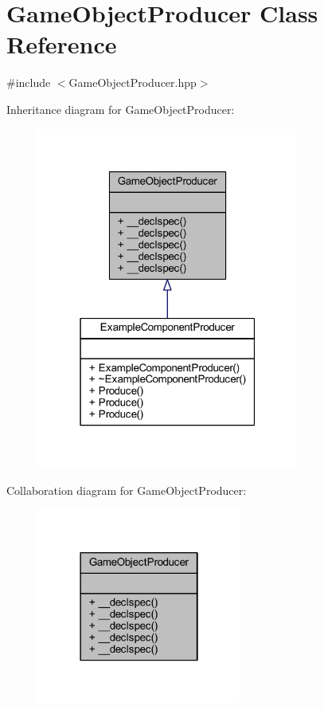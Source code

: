 \hypertarget{class_game_object_producer}{\section{Game\-Object\-Producer Class Reference}
\label{class_game_object_producer}
}


{\ttfamily \#include $<$Game\-Object\-Producer.\-hpp$>$}



Inheritance diagram for Game\-Object\-Producer\-:
\nopagebreak
\begin{figure}[H]
\begin{center}
\leavevmode
\includegraphics[width=244pt]{class_game_object_producer__inherit__graph}
\end{center}
\end{figure}


Collaboration diagram for Game\-Object\-Producer\-:\nopagebreak
\begin{figure}[H]
\begin{center}
\leavevmode
\includegraphics[width=190pt]{class_game_object_producer__coll__graph}
\end{center}
\end{figure}
